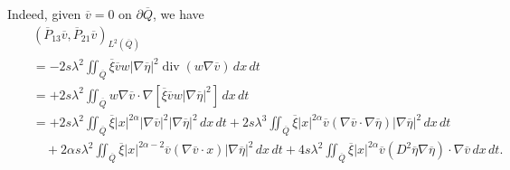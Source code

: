 \documentclass[11pt]{article}
\numberwithin{equation}{section}
\DeclareMathOperator{\Div}{div}
\begin{document}
Indeed, given $\overline{v}=0$ on $\partial\overline{Q}$, we have
\begin{eqnarray*}
	&&(\overline{P}_{13}\overline{v}, \overline{P}_{21}\overline{v})_{L^2(\overline{Q})}\\
	&&=-2s\lambda^2\iint_{\overline{Q}}\overline{\xi}\overline{v}w|\nabla\overline{\eta}|^2 \Div(w\nabla \overline{v})\,dx\,dt\\
	&&=+2s\lambda^2\iint_{\overline{Q}}w\nabla \overline{v} \cdot \nabla \left[\overline{\xi} \overline{v}w|\nabla\overline{\eta}|^2\right]\,dx\,dt\\
	&&=+2s\lambda^2\iint_{\overline{Q}}\overline{\xi} |x|^{2\alpha}|\nabla \overline{v}|^2|\nabla \overline{\eta}|^2\,dx\,dt + 2s\lambda^3\iint_{\overline{Q}}\overline{\xi} |x|^{2\alpha} \overline{v}(\nabla \overline{v} \cdot \nabla \overline{\eta})|\nabla \overline{\eta}|^2\,dx\,dt\\
	&&\quad + 2\alpha s\lambda^2\iint_{\overline{Q}}\overline{\xi}|x|^{2\alpha-2}\overline{v}(\nabla \overline{v} \cdot x)|\nabla \overline{\eta}|^2\,dx\,dt + 4s\lambda^2\iint_{\overline{Q}}\overline{\xi} |x|^{2\alpha}\overline{v}(D^2\overline{\eta}\nabla \overline{\eta}) \cdot \nabla \overline{v}\,dx\,dt.
\end{eqnarray*}
\end{document}
